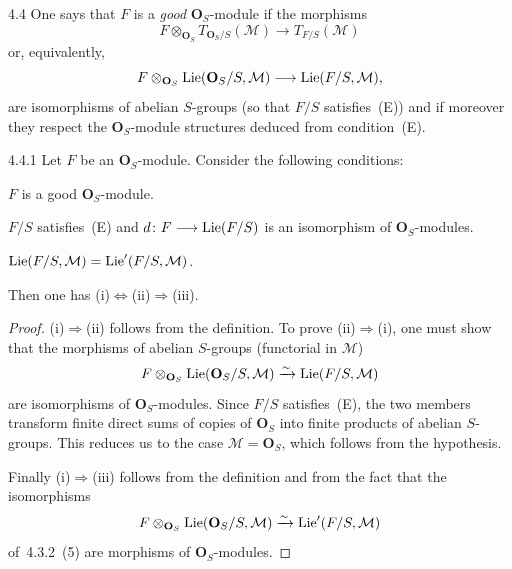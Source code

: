 \begin{definition}{4.4}\label{II.4.4}
One says that \(F\) is a \emph{good} \(\mathbf{O}_{S}\)-module if the
morphisms
\[
F\otimes_{\mathbf{O}_{S}}T_{\mathbf{O}_{S}/S}(\mathcal{M})
\longrightarrow
T_{F/S}(\mathcal{M})
\]
or, equivalently,
\[
F\otimes_{\mathbf{O}_{S}}\operatorname{Lie}(\mathbf{O}_{S}/S,\mathcal{M})
\longrightarrow
\operatorname{Lie}(F/S,\mathcal{M}),
\]
are isomorphisms of abelian \(S\)-groups (so that \(F/S\) satisfies~(E)) and
if moreover they respect the \(\mathbf{O}_{S}\)-module structures deduced
from condition~(E).
\end{definition}

\begin{corollary}{4.4.1}\label{II.4.4.1}
{\renewcommand{\thefootnote}{(69)}}
Let \(F\) be an \(\mathbf{O}_{S}\)-module. Consider the following conditions:
\begin{enumeratei}
\item \(F\) is a good \(\mathbf{O}_{S}\)-module.
\item \(F/S\) satisfies~(E) and \(d\colon F\longrightarrow\operatorname{Lie}(F/S)\) is an isomorphism
of \(\mathbf{O}_{S}\)-modules.
\item \(\operatorname{Lie}(F/S,\mathcal{M})=\operatorname{Lie}'(F/S,\mathcal{M})\).
\end{enumeratei}
Then one has \textup{(i)}\(\Leftrightarrow\)\textup{(ii)}\(\Rightarrow\)\textup{(iii)}.
\end{corollary}

\begin{proof}
\textup{(i)}\(\Rightarrow\)\textup{(ii)} follows from the definition. To prove
\textup{(ii)}\(\Rightarrow\)\textup{(i)}, one must show that the morphisms of
abelian \(S\)-groups (functorial in \(\mathcal{M}\))
\[
F\otimes_{\mathbf{O}_{S}}\operatorname{Lie}(\mathbf{O}_{S}/S,\mathcal{M})
\xrightarrow{\sim}
\operatorname{Lie}(F/S,\mathcal{M})
\]
are isomorphisms of \(\mathbf{O}_{S}\)-modules. Since \(F/S\) satisfies~(E),
the two members transform finite direct sums of copies of \(\mathbf{O}_{S}\)
into finite products of abelian \(S\)-groups. This reduces us to the case
\(\mathcal{M}=\mathbf{O}_{S}\), which follows from the hypothesis.

Finally \textup{(i)}\(\Rightarrow\)\textup{(iii)} follows from the definition
and from the fact that the isomorphisms
\[
F\otimes_{\mathbf{O}_{S}}\operatorname{Lie}(\mathbf{O}_{S}/S,\mathcal{M})
\xrightarrow{\sim}
\operatorname{Lie}'(F/S,\mathcal{M})
\]
of~4.3.2~(5) are morphisms of \(\mathbf{O}_{S}\)-modules.
\end{proof}

